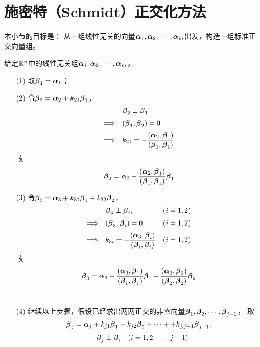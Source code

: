 \section{施密特（Schmidt）正交化方法}

\begin{frame}\ft{\secname}
本小节的目标是： 从一组线性无关的向量$\boldsymbol{\alpha}_1,\boldsymbol{\alpha}_2,\cdots,\boldsymbol{\alpha}_m$出发，构造一组标准正交向量组。
\end{frame}


\begin{frame}[allowframebreaks]\ft{\secname}

  给定$\R^n$中的线性无关组$\alphabd_1,\alphabd_2,\cd,\alphabd_m$， 
  \begin{itemize}
  \item[(1)] 取$\betabd_1=\alphabd_1$；\\[0.3in]
  \item[(2)] 令$\betabd_2=\alphabd_2+k_{21}\betabd_1$，
    $$
    \begin{array}{rl}
      &\betabd_2\perp\betabd_1\\[0.2cm]
      \Longrightarrow&(\betabd_1,\betabd_2)=0\\[0.2cm] 
      \Longrightarrow& \ds k_{21}=-\frac{(\alphabd_2,\betabd_1)}{(\betabd_1,\betabd_1)} 
    \end{array}
    $$
    故
    $$
    \betabd_2=\alphabd_2-\frac{(\alphabd_2,\betabd_1)}{(\betabd_1,\betabd_1)}\betabd_1
    $$
  \item[(3)] 令$\betabd_3=\alphabd_3+k_{31}\betabd_1+k_{32}\betabd_2$，
    $$
    \begin{array}{rll}
      &\betabd_3\perp\betabd_i, & (i=1,2)\\[0.2cm] 
      \Longrightarrow&(\betabd_3,\betabd_i)=0, & (i=1,2)\\[0.2cm] 
      \Longrightarrow& \ds k_{3i}=-\frac{(\alphabd_3,\betabd_i)}{(\betabd_i,\betabd_i)} & (i=1,2) 
    \end{array}
    $$
    故
    $$
    \betabd_3=\alphabd_3-\frac{(\alphabd_3,\betabd_1)}{(\betabd_1,\betabd_1)}\betabd_1
    -\frac{(\alphabd_3,\betabd_2)}{(\betabd_2,\betabd_2)}\betabd_2
    $$ \\[1in]
  \item[(4)] 继续以上步骤，假设已经求出两两正交的非零向量$\betabd_1,\betabd_2,\cd,\betabd_{j-1}$，
    取
    $$
    \betabd_j=\alphabd_j+k_{j1}\betabd_1+k_{j2}\betabd_2+\cd++k_{j,j-1}\betabd_{j-1},
    $$
    $$
    \begin{array}{rl}
      & \betabd_j \perp \betabd_i\quad (i=1,2,\cd,j-1)\\[0.4cm] 

\end{array}$$
\end{itemize}
\end{frame}
